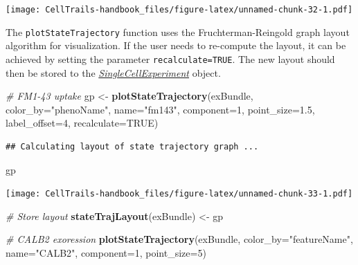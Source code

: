 \documentclass[]{book}
\newenvironment{Shaded}{\begin{snugshade}}{\end{snugshade}}
\newcommand{\KeywordTok}[1]{\textcolor[rgb]{0.13,0.29,0.53}{\textbf{#1}}}
\newcommand{\DataTypeTok}[1]{\textcolor[rgb]{0.13,0.29,0.53}{#1}}
\newcommand{\DecValTok}[1]{\textcolor[rgb]{0.00,0.00,0.81}{#1}}
\newcommand{\FloatTok}[1]{\textcolor[rgb]{0.00,0.00,0.81}{#1}}
\newcommand{\StringTok}[1]{\textcolor[rgb]{0.31,0.60,0.02}{#1}}
\newcommand{\CommentTok}[1]{\textcolor[rgb]{0.56,0.35,0.01}{\textit{#1}}}
\newcommand{\OtherTok}[1]{\textcolor[rgb]{0.56,0.35,0.01}{#1}}
\newcommand{\NormalTok}[1]{#1}
\theoremstyle{definition}
\theoremstyle{definition}
\theoremstyle{definition}
\theoremstyle{remark}
\begin{document}
\texttt{[image: CellTrails-handbook\_files/figure-latex/unnamed-chunk-32-1.pdf]}

The \texttt{plotStateTrajectory} function uses the Fruchterman-Reingold
graph layout algorithm \citep{fr} for visualization. If the user needs
to re-compute the layout, it can be achieved by setting the parameter
\texttt{recalculate=TRUE}. The new layout should then be stored to the
\emph{\href{http://bioconductor.org/packages/SingleCellExperiment}{SingleCellExperiment}}
object.

\begin{Shaded}
\begin{Highlighting}[]
\CommentTok{# FM1-43 uptake}
\NormalTok{gp <-}\StringTok{ }\KeywordTok{plotStateTrajectory}\NormalTok{(exBundle, }\DataTypeTok{color_by=}\StringTok{"phenoName"}\NormalTok{, }\DataTypeTok{name=}\StringTok{"fm143"}\NormalTok{, }
                          \DataTypeTok{component=}\DecValTok{1}\NormalTok{, }\DataTypeTok{point_size=}\FloatTok{1.5}\NormalTok{, }\DataTypeTok{label_offset=}\DecValTok{4}\NormalTok{, }
                          \DataTypeTok{recalculate=}\OtherTok{TRUE}\NormalTok{)}
\end{Highlighting}
\end{Shaded}

\begin{verbatim}
## Calculating layout of state trajectory graph ...
\end{verbatim}

\begin{Shaded}
\begin{Highlighting}[]
\NormalTok{gp}
\end{Highlighting}
\end{Shaded}

\texttt{[image: CellTrails-handbook\_files/figure-latex/unnamed-chunk-33-1.pdf]}

\begin{Shaded}
\begin{Highlighting}[]
\CommentTok{# Store layout}
\KeywordTok{stateTrajLayout}\NormalTok{(exBundle) <-}\StringTok{ }\NormalTok{gp}

\CommentTok{# CALB2 exoression}
\KeywordTok{plotStateTrajectory}\NormalTok{(exBundle, }\DataTypeTok{color_by=}\StringTok{"featureName"}\NormalTok{, }\DataTypeTok{name=}\StringTok{"CALB2"}\NormalTok{, }
                    \DataTypeTok{component=}\DecValTok{1}\NormalTok{, }\DataTypeTok{point_size=}\DecValTok{5}\NormalTok{)}
\end{Highlighting}
\end{Shaded}
\end{document}
